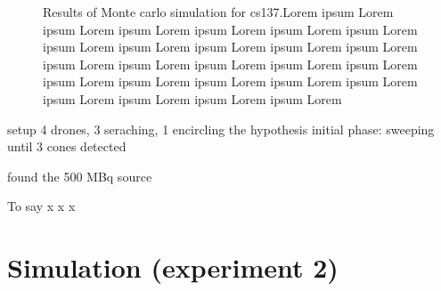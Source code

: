 \begin{figure}[!htb]
{    \label{fig:}
  }
  \newline
  \noindent 
  \caption{Results of Monte carlo simulation for cs137.Lorem ipsum  Lorem ipsum Lorem ipsum Lorem ipsum Lorem ipsum Lorem ipsum Lorem ipsum Lorem ipsum Lorem ipsum Lorem ipsum Lorem ipsum Lorem ipsum Lorem ipsum Lorem ipsum Lorem ipsum Lorem ipsum Lorem ipsum Lorem ipsum Lorem ipsum Lorem ipsum Lorem ipsum Lorem ipsum Lorem ipsum Lorem ipsum Lorem ipsum Lorem }
  \label{fig:}
\end{figure}%

setup 
4 drones, 3 seraching, 1 encircling the hypothesis
initial phase: sweeping until 3 cones detected

found the 500 MBq source

To say
x
x
x







\newpage
\section{Simulation (experiment 2)}%


